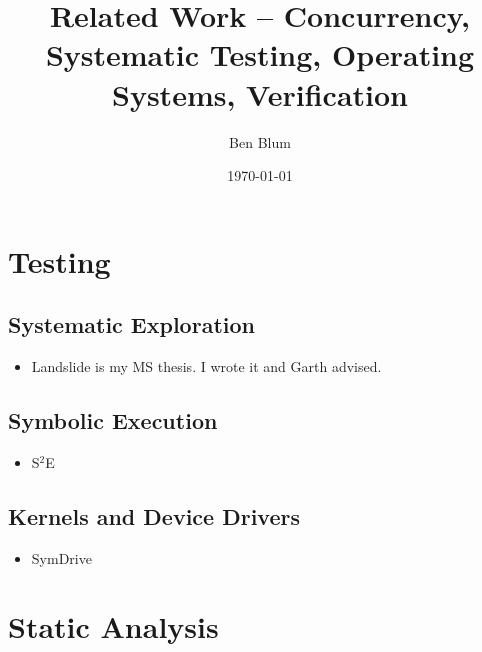 \documentclass{article}
\begin{document}

\title{Related Work -- Concurrency, Systematic Testing, Operating Systems, Verification}
\author{Ben Blum}
\date{\today}
\maketitle


\section{Testing}

\subsection{Systematic Exploration}
\begin{itemize}
	\item Landslide \cite{Landslide} is my MS thesis. I wrote it and Garth advised.
\end{itemize}

\subsection{Symbolic Execution}
\begin{itemize}
	\item S$^2$E \cite{s2e}
\end{itemize}

\subsection{Kernels and Device Drivers}
\begin{itemize}
	\item SymDrive \cite{symdrive}
\end{itemize}

\section{Static Analysis}
\end{document}
